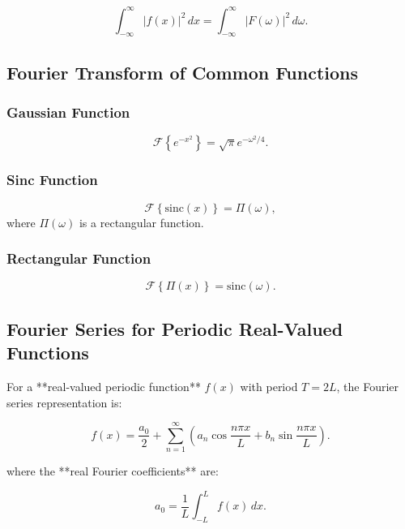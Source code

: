 \documentclass[../Main.tex]{subfiles}
\begin{document}
\begin{equation}
\int_{-\infty}^{\infty} |f(x)|^2 \, dx = \int_{-\infty}^{\infty} |F(\omega)|^2 \, d\omega.
\end{equation}

\subsection{Fourier Transform of Common Functions}

\subsubsection{Gaussian Function}
\begin{equation}
\mathcal{F} \left\{ e^{-x^2} \right\} = \sqrt{\pi} e^{-\omega^2 / 4}.
\end{equation}

\subsubsection{Sinc Function}
\begin{equation}
\mathcal{F} \left\{ \text{sinc}(x) \right\} = \Pi(\omega),
\end{equation}
where $\Pi(\omega)$ is a rectangular function.

\subsubsection{Rectangular Function}
\begin{equation}
\mathcal{F} \left\{ \Pi(x) \right\} = \text{sinc}(\omega).
\end{equation}
\subsection{Fourier Series for Periodic Real-Valued Functions}

For a **real-valued periodic function** \( f(x) \) with period \( T = 2L \), the Fourier series representation is:

\begin{equation}
f(x) = \frac{a_0}{2} + \sum_{n=1}^{\infty} \left( a_n \cos \frac{n\pi x}{L} + b_n \sin \frac{n\pi x}{L} \right).
\end{equation}

where the **real Fourier coefficients** are:

\begin{equation}
a_0 = \frac{1}{L} \int_{-L}^{L} f(x) \, dx.
\end{equation}
\end{document}
